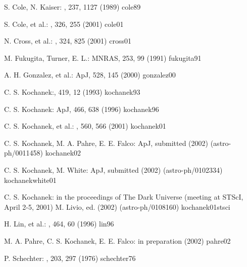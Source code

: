 
{ S. Cole, N. Kaiser: \mnras, 237, 1127 (1989) {cole89}

{ S. Cole, et al.: \mnras, 326, 255 (2001) {cole01}

{ N. Cross, et al.: \mnras, 324, 825 (2001) {cross01}

{ M. Fukugita, Turner, E. L.: MNRAS, 253, 99 (1991) {fukugita91}

{ A. H. Gonzalez, et al.: ApJ, 528, 145 (2000) {gonzalez00}

{  C. S. Kochanek:\apj, 419, 12 (1993) {kochanek93}

{ C. S. Kochanek:  ApJ, 466, 638 (1996) {kochanek96}

{ C. S. Kochanek, et al.: \apj, 560, 566 (2001) {kochanek01}

{ C. S. Kochanek, M. A. Pahre, E. E. Falco: ApJ, submitted (2002)
	(astro-ph/0011458) {kochanek02}

{ C. S. Kochanek, M. White:  ApJ, submitted (2002)
	(astro-ph/0102334) {kochanekwhite01}

{ C. S. Kochanek: in the proceedings of The Dark Universe
	(meeting at STScI, April 2-5, 2001) M. Livio, ed. (2002) (astro-ph/0108160) {kochanek01stsci}

{ H. Lin, et al.: \apj, 464, 60 (1996) {lin96}

{ M. A. Pahre, C. S. Kochanek, E. E. Falco:  in preparation (2002) {pahre02}

{ P. Schechter: \apj, 203, 297 (1976) {schechter76}


}}}}}}}}}}}}}}

